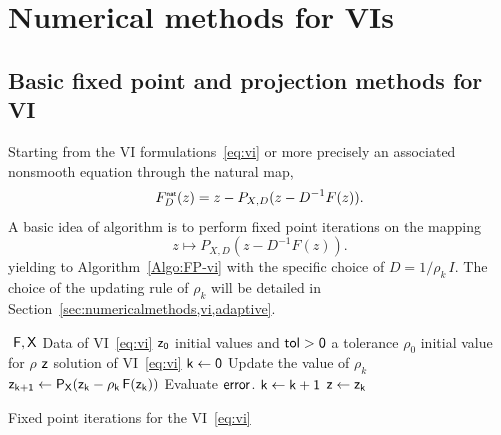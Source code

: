 \section{Numerical methods for VIs}
\label{sec:numericalmethods,vi}


\subsection{Basic fixed point  and projection methods for VI}

Starting from the VI formulations~\eqref{eq:vi} or more precisely an associated nonsmooth equation through the natural map,
\begin{equation}
  \label{eq:skew-natural-NE-bis}
   F_D^\nat(z) = z - P_{X,D}(z-D^{-1} F(z)).
\end{equation}
A basic idea of algorithm is to perform fixed point iterations on the mapping
\begin{equation}
  \label{eq:skew-fixed-point}
   z \mapsto P_{X,D}(z-D^{-1} F(z)).
\end{equation}
yielding to Algorithm~\ref{Algo:FP-vi} with the specific choice of $D=1/\rho_k \, I$. The choice of the updating rule of $\rho_k$ will be detailed in Section~\ref{sec:numericalmethods,vi,adaptive}.

\begin{algorithm}
  \begin{algorithmic}
    {\sf
      \STATE $ $
      \REQUIRE $\sf F,X$ Data of VI~\eqref{eq:vi}
      \REQUIRE $\sf z_0$ initial values and $\sf tol >0$ a tolerance
      \REQUIRE $\rho_0$ initial value for $\rho$
      \ENSURE  $\sf z$ solution of VI~\eqref{eq:vi}
      \STATE   $\sf k \leftarrow 0$ 
      \STATE Update the value of $\rho_k$
      \STATE $\sf z_{k+1} \leftarrow P_{X}(z_k - \rho_k\,F(z_k))$
      \STATE Evaluate $\sf error$.
      \STATE $\sf k \leftarrow k+1$
      \ENDWHILE
      \STATE $\sf z \leftarrow z_{k}$ 
    }
  \end{algorithmic}
  \caption{Fixed point iterations for the VI~\eqref{eq:vi}}  \label{Algo:FP-vi}
\end{algorithm}



